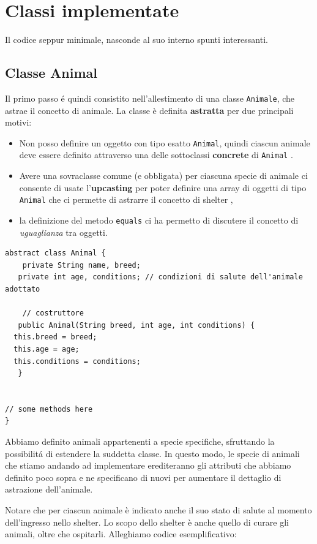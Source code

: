 \documentclass[a4paper,11pt]{article}
\begin{document}
\section{Classi implementate}
Il codice seppur minimale, nasconde al suo interno spunti interessanti.


\subsection{Classe Animal}

Il primo passo \'e quindi consistito nell'allestimento di una classe {\tt Animale}, che astrae il concetto di animale. La classe è definita \textbf{astratta} per due principali motivi:
\begin{itemize}
    \item Non posso definire un oggetto con tipo esatto {\tt Animal}, quindi ciascun animale deve essere definito attraverso una delle sottoclassi \textbf{concrete} di {\tt Animal} \cite{java}.
    \item Avere una sovraclasse comune (e obbligata) per ciascuna specie di animale ci consente di usate l'\textbf{upcasting} per poter definire una array di oggetti di tipo {\tt Animal} che ci permette di astrarre il concetto di shelter \cite{java_book},
    \item la definizione del metodo {\tt equals} ci ha permetto di discutere il concetto di {\em uguaglianza} tra oggetti.
\end{itemize}

\begin{lstlisting}[caption={Animal.java -- Allestimento della classe Animale}]
abstract class Animal {
 	private String name, breed;
   private int age, conditions; // condizioni di salute dell'animale adottato

	// costruttore
   public Animal(String breed, int age, int conditions) {
  this.breed = breed;
  this.age = age;
  this.conditions = conditions;
   }


// some methods here 
}

\end{lstlisting}

Abbiamo definito animali appartenenti a specie specifiche, sfruttando la possibilit\'a di estendere la suddetta classe. In questo modo, le specie di animali che stiamo andando ad implementare erediteranno gli attributi che abbiamo definito poco sopra e ne specificano di nuovi per aumentare il dettaglio di astrazione dell'animale.

Notare che per ciascun animale è indicato anche il suo stato di salute al momento dell'ingresso nello shelter. Lo scopo dello shelter è anche quello di curare gli animali, oltre che ospitarli. Alleghiamo codice esemplificativo:
\end{document}
